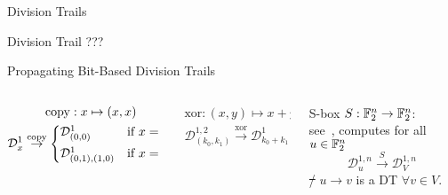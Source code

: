 \begin{frame}{Division Trails}
    \begin{block}{Division Trail}
        ???
    \end{block}
    \begin{block}{Propagating Bit-Based Division Trails}
        \vspace*{5pt}
        \begin{columns}
        \begin{column}{0.3\textwidth}
            \vspace*{-10pt}
            \begin{gather*}
                \mathrm{copy} : x \mapsto (x, x) \\
                \mathcal{D}^1_x \stackrel{\mathrm{copy}}{\to} \begin{cases*}
                    \mathcal{D}^1_{(0,0)}       & if $x = 0$ \\
                    \mathcal{D}^1_{(0,1),(1,0)} & if $x = 1$
                \end{cases*}
            \end{gather*}
            \vspace*{-3pt}
        \end{column}
        \begin{column}{0.3\textwidth}
            \vspace*{-10pt}
            \begin{gather*}
                \mathrm{xor} : (x,y) \mapsto x + y \\
                \mathcal{D}^{1,2}_{(k_0,k_1)} \stackrel{\mathrm{xor}}{\to} \mathcal{D}^1_{k_0+k_1}
            \end{gather*}
        \end{column}
        \begin{column}{0.3\textwidth}
            \centering
            S-box $S : \mathbb{F}_2^n \to \mathbb{F}_2^n$:\\
            see~\cite[Algorithm~2]{AC:XZBL16},
            computes for all $u \in \mathbb{F}_2^n$\\
            \vspace*{-15pt}
            \begin{equation*}
                \mathcal{D}^{1,n}_{u} \stackrel{S}{\to} \mathcal{D}^{1,n}_V
            \end{equation*}
            \st/ $u \to v$ is a DT $\forall v \in V$.
        \end{column}
        \end{columns}
        \vspace*{5pt}
    \end{block}
\end{frame}

